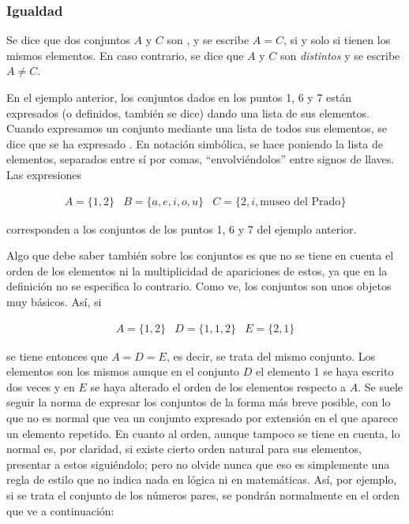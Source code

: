 \subsubsection{Igualdad}

Se dice que dos conjuntos $A$ y $C$ son , y se escribe $A =
C$, si y solo si tienen los mismos elementos. En caso contrario, se dice que
$A$ y $C$ son \emph{distintos} y se escribe $A \neq C$.

En el ejemplo anterior, los conjuntos dados en los puntos 1, 6 y 7 están
expresados (o definidos, también se dice) dando una lista de sus elementos.
Cuando expresamos un conjunto mediante una lista de todos sus elementos, se
dice que se ha expresado . En notación simbólica, se
hace poniendo la lista de elementos, separados entre sí por comas,
``envolviéndolos'' entre signos de llaves. Las expresiones

\[
  \begin{array}{ccc}
    A = \{1, 2\}
      & B = \{a, e, i, o, u\}
      & C = \{2, i, \text{museo del Prado}\}
  \end{array}
\]

\noindent corresponden a los conjuntos de los puntos 1, 6 y 7 del ejemplo
anterior.

Algo que debe saber también sobre los conjuntos es que no se tiene en cuenta
el orden de los elementos ni la multiplicidad de apariciones de estos, ya
que en la definición no se especifica lo contrario. Como ve, los conjuntos
son unos objetos muy básicos. Así, si

$$
\begin{array}{lcr}
  A = \{1, 2\}
    & D = \{1, 1, 2\}
    & E = \{2, 1\}
\end{array}
$$

\noindent se tiene entonces que $A = D = E$, es decir, se trata del mismo
conjunto. Los elementos son los mismos aunque en el conjunto $D$ el elemento
1 se haya escrito dos veces y en $E$ se haya alterado el orden de los
elementos respecto a $A$. Se suele seguir la norma de expresar los conjuntos
de la forma más breve posible, con lo que no es normal que vea un conjunto
expresado por extensión en el que aparece un elemento
repetido.\footnotemark{} En cuanto al orden, aunque tampoco se tiene en
cuenta, lo normal es, por claridad, si existe cierto orden natural para sus
elementos, presentar a estos siguiéndolo; pero no olvide nunca que eso es
simplemente una regla de estilo que no indica nada en lógica ni en
matemáticas. Así, por ejemplo, si se trata el conjunto de los números pares,
se pondrán normalmente en el orden que ve a continuación:

